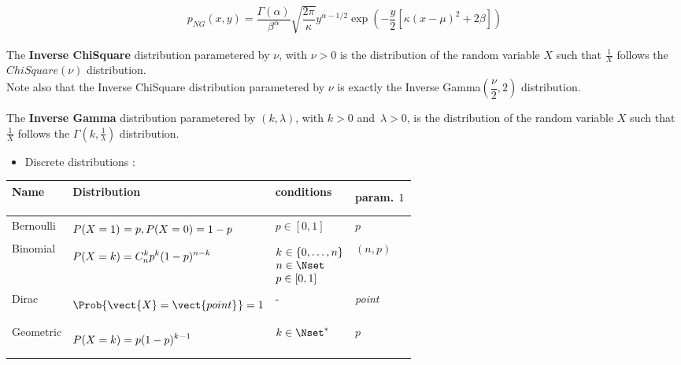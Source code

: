 \begin{align*}
   p_{NG}(x,y) =  \dfrac{\Gamma(\alpha)}{\beta^\alpha}\sqrt{\dfrac{2\pi}{\kappa}}y^{\alpha-1/2}\exp\left(-\dfrac{y}{2}\left[\kappa(x-\mu)^2+2\beta\right]\right)
\end{align*}


The {\bf Inverse ChiSquare} distribution parametered by $\nu$, with $\nu>0$ is the distribution of the random variable $X$ such that $\displaystyle \frac{1}{X}$ follows the $ChiSquare(\nu)$ distribution.\\
Note also that the Inverse ChiSquare distribution parametered by $\nu$ is exactly the Inverse Gamma$(\dfrac{\nu}{2}, 2)$ distribution.


The {\bf Inverse Gamma} distribution parametered by $(k,\lambda)$, with $k>0$ and~$\lambda>0$, is the distribution of the random variable $X$ such that $\displaystyle \frac{1}{X}$ follows the $\Gamma(k, \frac{1}{\lambda})$ distribution.





\begin{itemize}
\item Discrete distributions :
\end{itemize}

{\footnotesize
  \noindent \begin{tabular}{|p{2cm}|p{8cm}|p{4cm}|p{2cm}|}
    \hline
    Name & Distribution & \multicolumn{1}{l|}{conditions} & param. $1^{\strut}_{\strut}$\\
    \hline
    Bernoulli & $\displaystyle P(X = 1)^{\strut} = p, P(X = 0) = 1-p $ & $p \in [0,1]$ & $p$\\
    \hline
    Binomial & $\displaystyle P(X = k) = C_n^k p^k (1-p)^{{n-k}^{\strut}}$ &
    $\begin{array}{@{}l@{}}
      k^{\strut} \in \{0, \hdots, n\} \\
      n \in \Nset \\
      p \in [0,1]
    \end{array}
    $
    & $(n,p)$\\
    \hline
    Dirac & $ \Prob{\vect{X} = \vect{point}_{\strut}^{\strut}} = 1$ & - & \textit{point}\\
    \hline
    Geometric & $\displaystyle P(X = k) = p(1-p)^{k^{\strut}-1}_{\strut}$ & $k \in \Nset^{*}$ & $p$\\
    \hline
  \end{tabular}
}



